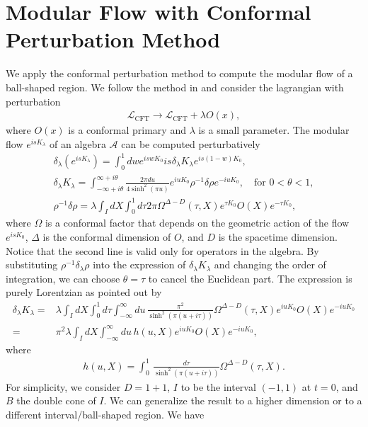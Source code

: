 \documentclass[a4paper,11pt]{article}
\theoremstyle{definition}
\begin{document}
\section{Modular Flow with Conformal Perturbation Method}
We apply the conformal perturbation method to compute the modular flow of a ball-shaped region. We follow the method in \cite{} and consider the lagrangian with perturbation
\begin{align}
    \mathcal{L}_\text{CFT} \to \mathcal{L}_\text{CFT} + \lambda O(x),
\end{align}
where $O(x)$ is a conformal primary and $\lambda$ is a small parameter. The modular flow $e^{isK_\lambda}$ of an algebra $\mathcal{A}$ can be computed perturbatively
\begin{gather}
    \delta_\lambda(e^{isK_\lambda}) = \int_0^1 dw e^{iswK_0} is\delta_\lambda K_\lambda e^{is(1-w)K_0} , \\
    \delta_\lambda K_\lambda= \int_{-\infty + i\theta}^{\infty + i\theta} \frac{2\pi du}{4\sinh^2(\pi u)} e^{iuK_0}\rho^{-1}\delta\rho e^{-iuK_0}, \quad\text{for } 0<\theta<1,\\
    \rho^{-1}\delta\rho = \lambda\int_I dX\int_0^1 d\tau 2\pi\Omega^{\Delta - D}(\tau,X) e^{\tau K_0} O(X) e^{-\tau K_0} ,
\end{gather}
where $\Omega$ is a conformal factor that depends on the geometric action of the flow $e^{is K_0}$, $\Delta$ is the conformal dimension of $O$, and $D$ is the spacetime dimension. Notice that the second line is valid only for operators in the algebra. By substituting $\rho^{-1}\delta_\lambda\rho$ into the expression of $\delta_\lambda K_\lambda$ and changing the order of integration, we can choose $\theta = \tau$ to cancel the Euclidean part. The expression is purely Lorentzian as pointed out by \cite{}
\begin{align}
    \delta_\lambda K_\lambda=& \lambda\int_I dX\int_0^1 d\tau \int_{-\infty}^{\infty} du \, \frac{\pi^2}{\sinh^2(\pi (u+i\tau))}   \Omega^{\Delta - D}(\tau,X) e^{iuK_0} O(X) e^{-iuK_0} \\
    =& \pi^2 \lambda\int_I dX \int_{-\infty}^{\infty} du \, h(u,X) e^{iuK_0} O(X) e^{-iuK_0},
\end{align}
where 
\begin{align}
    h(u,X) = \int_0^1\, \frac{ d\tau }{\sinh^2(\pi (u+i\tau))} \Omega^{\Delta - D}(\tau,X).
\end{align}
For simplicity, we consider $D = 1+1$, $I$ to be the interval $(-1,1)$ at $t = 0$, and $B$ the double cone of $I$. We can generalize the result to a higher dimension or to a different interval/ball-shaped region. We have 
\end{document}
